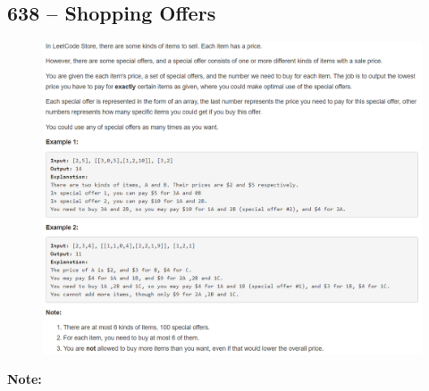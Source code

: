 \documentclass[a4paper,12pt]{article}
\begin{document}
\subsection{638 -- Shopping Offers}
\begin{figure}[H]
	\begin{center}
		\includegraphics[width=18cm]{638.png}
	\end{center}
\end{figure}
\textbf{\large{Note:}}
\par
\vspace{0.5em}
\end{document}

